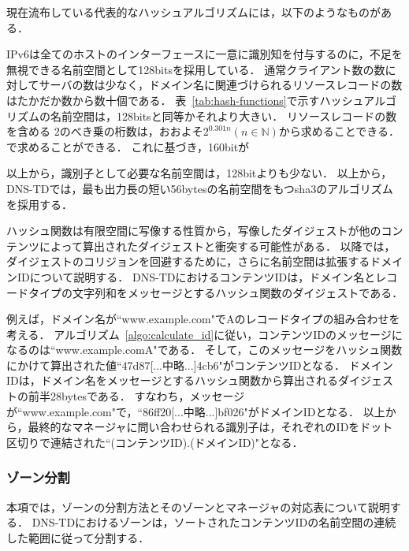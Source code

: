 現在流布している代表的なハッシュアルゴリズムには，以下のようなものがある．

IPv6は全てのホストのインターフェースに一意に識別知を付与するのに，不足を無視できる名前空間として128bitsを採用している．
通常クライアント数の数に対してサーバの数は少なく，ドメイン名に関連づけられるリソースレコードの数はたかだか数から数十個である．
表~\ref{tab:hash-functions}で示すハッシュアルゴリズムの名前空間は，128bitsと同等かそれより大きい．
リソースレコードの数を含める
2のべき乗の桁数は，おおよそ$2^{0.301n}$$(n \in \mathbb{N})$から求めることできる．
で求めることができる．
これに基づき，160bitが

以上から，識別子として必要な名前空間は，128bitよりも少ない．
以上から，DNS-TDでは，最も出力長の短い56bytesの名前空間をもつsha3のアルゴリズムを採用する．

ハッシュ関数は有限空間に写像する性質から，写像したダイジェストが他のコンテンツによって算出されたダイジェストと衝突する可能性がある．
以降では，ダイジェストのコリジョンを回避するために，さらに名前空間は拡張するドメインIDについて説明する．
DNS-TDにおけるコンテンツIDは，ドメイン名とレコードタイプの文字列和をメッセージとするハッシュ関数のダイジェストである．



例えば，ドメイン名が``www.example.com"でAのレコードタイプの組み合わせを考える．
アルゴリズム~\ref{algo:calculate_id}に従い，コンテンツIDのメッセージになるのは``www.example.comA"である．
そして，このメッセージをハッシュ関数にかけて算出された値``47d87[...中略...]4cb6"がコンテンツIDとなる．
ドメインIDは，ドメイン名をメッセージとするハッシュ関数から算出されるダイジェストの前半28bytesである．
すなわち，メッセージが``www.example.com"で，``86ff20[...中略...]bf026"がドメインIDとなる．
以上から，最終的なマネージャに問い合わせられる識別子は，それぞれのIDをドット区切りで連結された``(コンテンツID).(ドメインID)"となる．

\subsubsection{ゾーン分割}
本項では，ゾーンの分割方法とそのゾーンとマネージャの対応表について説明する．
DNS-TDにおけるゾーンは，ソートされたコンテンツIDの名前空間の連続した範囲に従って分割する．

